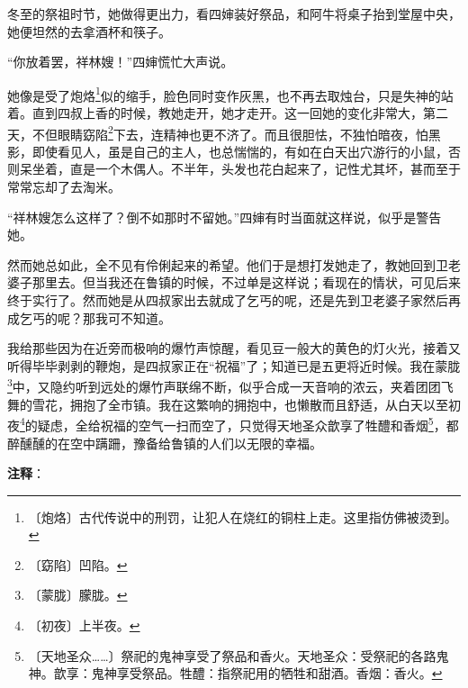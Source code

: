 \documentclass[12pt,UTF-8,openany]{ctexbook}
\begin{document}
\begin{large}
    冬至的祭祖时节，她做得更出力，看四婶装好祭品，和阿牛将桌子抬到堂屋中央，她便坦然的去拿酒杯和筷子。
    
    “你放着罢，祥林嫂！”四婶慌忙大声说。
    
    她像是受了炮烙\footnote{〔炮烙〕古代传说中的刑罚，让犯人在烧红的铜柱上走。这里指仿佛被烫到。}似的缩手，脸色同时变作灰黑，也不再去取烛台，只是失神的站着。直到四叔上香的时候，教她走开，她才走开。这一回她的变化非常大，第二天，不但眼睛窈陷\footnote{〔窈陷〕凹陷。}下去，连精神也更不济了。而且很胆怯，不独怕暗夜，怕黑影，即使看见人，虽是自己的主人，也总惴惴的，有如在白天出穴游行的小鼠，否则呆坐着，直是一个木偶人。不半年，头发也花白起来了，记性尤其坏，甚而至于常常忘却了去淘米。
    
    “祥林嫂怎么这样了？倒不如那时不留她。”四婶有时当面就这样说，似乎是警告她。
    
    然而她总如此，全不见有伶俐起来的希望。他们于是想打发她走了，教她回到卫老婆子那里去。但当我还在鲁镇的时候，不过单是这样说；看现在的情状，可见后来终于实行了。然而她是从四叔家出去就成了乞丐的呢，还是先到卫老婆子家然后再成乞丐的呢？那我可不知道。
    
    我给那些因为在近旁而极响的爆竹声惊醒，看见豆一般大的黄色的灯火光，接着又听得毕毕剥剥的鞭炮，是四叔家正在“祝福”了；知道已是五更将近时候。我在蒙胧\footnote{〔蒙胧〕朦胧。}中，又隐约听到远处的爆竹声联绵不断，似乎合成一天音响的浓云，夹着团团飞舞的雪花，拥抱了全市镇。我在这繁响的拥抱中，也懒散而且舒适，从白天以至初夜\footnote{〔初夜〕上半夜。}的疑虑，全给祝福的空气一扫而空了，只觉得天地圣众歆享了牲醴和香烟\footnote{〔天地圣众……〕祭祀的鬼神享受了祭品和香火。天地圣众：受祭祀的各路鬼神。歆享：鬼神享受祭品。牲醴：指祭祀用的牺牲和甜酒。香烟：香火。}，都醉醺醺的在空中蹒跚，豫备给鲁镇的人们以无限的幸福。
    
\end{large}


\newpage

\textbf{注释}：

\vspace{-1em}
\end{document}
